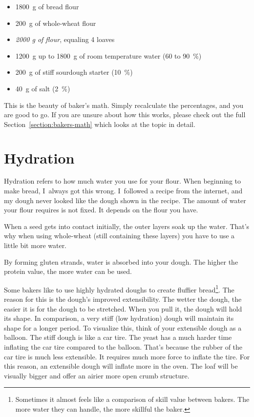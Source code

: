 \begin{itemize}
  \item \qty{1800}{\gram} of bread flour
  \item \qty{200}{\gram} of whole-wheat flour
  \item \emph{2000 g of flour}, equaling 4 loaves
  \item \qty{1200}{\gram} up to \qty{1800}{\gram} of room temperature water (60 to \qty{90}{\percent})
  \item \qty{200}{\gram} of stiff sourdough starter (\qty{10}{\percent})
  \item \qty{40}{\gram} of salt (\qty{2}{\percent})
\end{itemize}

This is the beauty of baker's math. Simply recalculate the percentages, and you
are good to go. If you are unsure about how this works, please check out the
full Section~\ref{section:bakers-math} which looks at the topic in detail.

\section{Hydration}

Hydration refers to how much water you use for your flour. When
beginning to make bread, I~always got this wrong. I~followed a recipe from the
internet, and my dough never looked like the dough shown in the recipe.
The amount of water your flour requires is not fixed. It depends on the flour
you have.

When a seed gets into contact initially, the outer layers soak up the water.
That's why when using whole-wheat (still containing these layers) you have to
use a little bit more water.

By forming gluten strands, water is absorbed into your dough. The higher the
protein value, the more water can be used.

Some bakers like to use highly hydrated doughs to create fluffier
bread\footnote{Sometimes it almost feels like a comparison of skill value
between bakers. The more water they can handle, the more skillful the baker.}.
The reason for this
is the dough's improved extensibility. The wetter the dough, the easier it is
for the dough to be stretched. When you pull it, the dough will hold its
shape. In comparison, a very stiff (low hydration) dough will maintain its
shape for a longer period. To visualize this, think of your extensible
dough as a balloon. The stiff dough is like a car tire.
The yeast has a much harder time inflating the car tire compared to the balloon.
That’s because the rubber of the car tire is much less extensible.
It requires much more force to inflate the tire. For this reason,
an extensible dough will inflate more in the oven. The loaf will
be visually bigger and offer an airier more open crumb structure.

